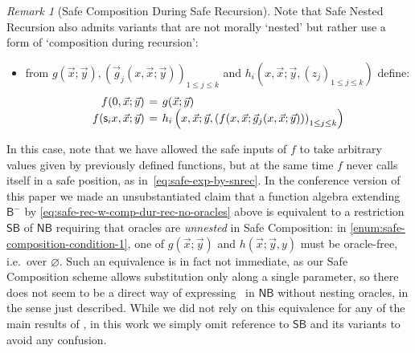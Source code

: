 \documentclass[manuscript,screen]{acmart}
\renewcommand{\emptyset}{\varnothing}
\theoremstyle{definition}
\theoremstyle{remark}
\newtheorem{rem}[thm]{Remark}
\renewcommand{\succ}[1]{\mathsf{s}_{#1}}
\newcommand{\bc}{\mathsf{B}}
\newcommand{\bcnorec}{\bc^{-}}
\newcommand{\nested}{\mathsf{N}}
\newcommand{\nbc}{\nested\bc}
\newcommand{\shallow}{\mathsf{S}}
\newcommand{\sbc}{\shallow\bc}
\begin{document}
\begin{rem}[Safe Composition During Safe Recursion]
\label{rem:errata}
    Note that Safe Nested Recursion also admits variants that are not morally `nested' but rather use a form of `composition during recursion':
\begin{itemize}
    \item from $g(\vec x; \vec y), \left(\vec g_j(x, \vec x; \vec y)\right)_{1 \leq j \leq k}$ and  $h_i\left(x, \vec x; \vec y, (z_j)_{1 \leq j \leq k}\right)$  define:
    \begin{equation}
        \label{eq:safe-rec-w-comp-dur-rec-no-oracles}
         \arraycolsep=2pt
    \begin{array}{rcll}
         f(0, \vec x; \vec y) &=&g(\vec x;\vec y)\\
         f(\succ i x , \vec x; \vec y) &=& 
    h_i \left(x, \vec x; \vec y, \left(f(x, \vec x; \vec g_j(x, \vec x; \vec y))\right)_{1 \leq j \leq k}\right)
        \end{array}
    \end{equation}
\end{itemize}
In this case, note that we have allowed the safe inputs of $f$ to take arbitrary values given by previously defined functions, but at the same time $f$ never calls itself in a safe position, as in~\eqref{eq:safe-exp-by-snrec}. 
In the conference version of this paper \cite[p.8]{CurziDas:lics22} we made an unsubstantiated claim that a function algebra extending $\bcnorec$ by \eqref{eq:safe-rec-w-comp-dur-rec-no-oracles} above is equivalent to a restriction $\sbc$ of $\nbc$ requiring that oracles are \emph{unnested} in Safe Composition: in \cref{enum:safe-composition-condition-1}, one of $g(\vec x;\vec y)$ and $h(\vec x;\vec y,y)$ must be oracle-free, i.e.\ over $\emptyset$. 
Such an equivalence is in fact not immediate, as our Safe Composition scheme allows substitution only along a single parameter, so there does not seem to be a direct way of expressing~ in $\nbc$ without nesting oracles, in the sense just described. 
While we did not rely on this equivalence for any of the main results of \cite{CurziDas:lics22}, in this work we simply omit reference to $\sbc$ and its variants to avoid any confusion.


\end{rem}
\end{document}
